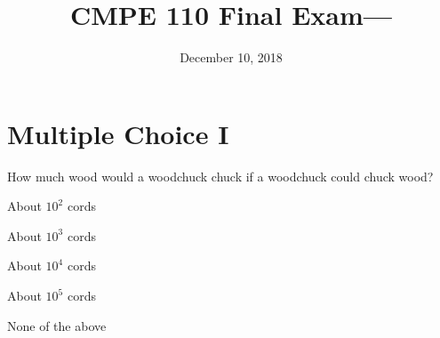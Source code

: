 \documentclass[11pt,nochoiceboxes,solutions]{exam3}
\begin{document}
\title{CMPE 110 Final Exam---}
\date{December 10, 2018}
\maketitle

\thispagestyle{fancy}
\setlength{\partopsep}{0pt}

\section*{Multiple Choice I}


\begin{problem}{2}
  How much wood would a woodchuck chuck if a woodchuck could chuck wood?
  \begin{exammc}
    \item *About $10^2$ cords
    \item About $10^3$ cords
    \item About $10^4$ cords
    \item About $10^5$ cords
    \item None of the above
  \end{exammc}
\end{problem}




\showpoints
\end{document}
